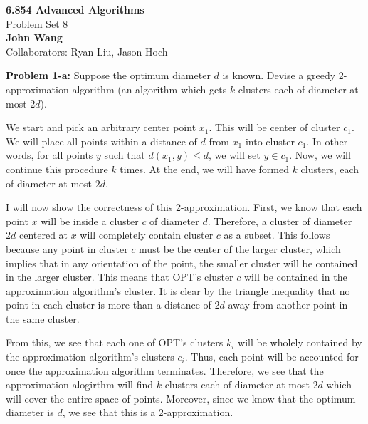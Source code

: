 \documentclass[psamsfonts]{amsart}
\newenvironment{sol}{\vspace{0.25cm}{\large \bfseries Solution:}}{\qedsymbol}
\newenvironment{prob}[1]{\begin{framed}{\large \bfseries Problem #1:}}{\end{framed}}
\newcommand{\makenewtitle}{
    \begin{center}
    {\huge \bfseries 6.854 Advanced Algorithms} \\
    Problem Set 8\\
    \vspace{0.25cm}
    {\bfseries John Wang} \\
    Collaborators: Ryan Liu, Jason Hoch 
    \end{center}
    \vspace{0.5cm}
}
\begin{document}
\makenewtitle

\begin{prob}{1-a}
Suppose the optimum diameter $d$ is known. Devise a greedy 2-approximation algorithm (an algorithm which gets $k$ clusters each of diameter at most $2d$). 
\end{prob}
\begin{sol}
We start and pick an arbitrary center point $x_1$. This will be center of cluster $c_1$. We will place all points within a distance of $d$ from $x_1$ into cluster $c_1$. In other words, for all points $y$ such that $d(x_1, y) \leq d$, we will set $y \in c_1$. Now, we will continue this procedure $k$ times. At the end, we will have formed $k$ clusters, each of diameter at most $2d$. 

I will now show the correctness of this 2-approximation. First, we know that each point $x$ will be inside a cluster $c$ of diameter $d$. Therefore, a cluster of diameter $2d$ centered at $x$ will completely contain cluster $c$ as a subset. This follows because any point in cluster $c$ must be the center of the larger cluster, which implies that in any orientation of the point, the smaller cluster will be contained in the larger cluster. This means that OPT's cluster $c$ will be contained in the approximation algorithm's cluster. It is clear by the triangle inequality that no point in each cluster is more than a distance of $2d$ away from another point in the same cluster.

From this, we see that each one of OPT's clusters $k_i$ will be wholely contained by the approximation algorithm's clusters $c_i$. Thus, each point will be accounted for once the approximation algorithm terminates. Therefore, we see that the approximation alogirthm will find $k$ clusters each of diameter at most $2d$ which will cover the entire space of points. Moreover, since we know that the optimum diameter is $d$, we see that this is a 2-approximation.
\end{sol}
\end{document}

